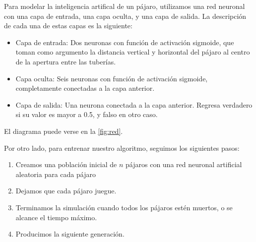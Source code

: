 \documentclass[twocolumn,spanish]{revtex4-1}
\begin{document}
Para modelar la inteligencia artifical de un pájaro, utilizamos una red neuronal con una capa de entrada, una capa oculta, y una capa de salida. La descripción de cada una de estas capas es la siguiente:
\begin{itemize}
    \item Capa de entrada: Dos neuronas con función de activación sigmoide, que toman como argumento la distancia vertical y horizontal del pájaro al centro de la apertura entre las tuberías.
    \item Capa oculta: Seis neuronas con función de activación sigmoide, completamente conectadas a la capa anterior.
    \item Capa de salida: Una neurona conectada a la capa anterior. Regresa verdadero si su valor es mayor a 0.5, y falso en otro caso.
\end{itemize}
El diagrama puede verse en la \cref{fig:red}.

Por otro lado, para entrenar nuestro algoritmo, seguimos los siguientes pasos:
\begin{enumerate}
	\item Creamos una población inicial de $n$ pájaros con una red neuronal artificial aleatoria para cada pájaro
	\item Dejamos que cada pájaro juegue.
	\item Terminamos la simulación cuando todos los pájaros estén muertos, o se alcance el tiempo máximo.
    \item Producimos la siguiente generación.
\end{enumerate}
\end{document}
